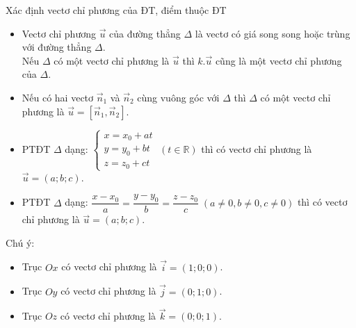 \begin{dang}{Xác định vectơ chỉ phương của ĐT, điểm thuộc ĐT}
	\begin{itemize}
	\item  Vectơ chỉ phương $\overrightarrow{u}$ của đường thẳng $\Delta $ là vectơ có giá song song hoặc trùng với đường thẳng $\Delta $.\\
Nếu $\Delta $ có một vectơ chỉ phương là $\overrightarrow{u}$ thì $k.\overrightarrow{u}$ cũng là một vectơ chỉ phương của $\Delta $.
	\item    Nếu có hai vectơ $\overrightarrow{n}_{1} $ và $\overrightarrow{n}_{2} $ cùng vuông góc với $\Delta $ thì $\Delta $ có một vectơ chỉ phương là $\overrightarrow{u}=[\overrightarrow{n}_{1} ,\overrightarrow{n}_{2} ].$
   \item PTĐT \(\Delta\) dạng: \(\left\{\begin{array}{l} x = x_0 + at \\ y = y_0 + bt \\ z = z_0 + ct \end{array}\right. \; (t \in \mathbb{R})\) thì có vectơ chỉ phương là \(\overrightarrow{u} = (a; b; c)\).
    \item PTĐT \(\Delta\) dạng: \(\dfrac{x - x_0}{a} = \dfrac{y - y_0}{b} = \dfrac{z - z_0}{c} \; (a \neq 0, b \neq 0, c \neq 0)\) thì có vectơ chỉ phương là \(\overrightarrow{u} = (a; b; c)\).
\end{itemize}

\begin{note} Chú ý:
\begin{itemize}
	\item  Trục $Ox$ có vectơ chỉ phương là $\overrightarrow{i}=(1;0;0)$.
	\item  Trục $Oy$ có vectơ chỉ phương là $\overrightarrow{j}=(0;1;0)$.
	\item  Trục $Oz$ có vectơ chỉ phương là $\overrightarrow{k}=(0;0;1)$.
\end{itemize}
 \end{note}


\end{dang}

